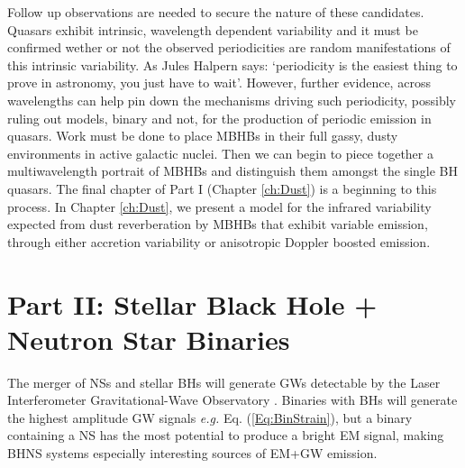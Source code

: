 Follow up observations are needed to secure the nature of these candidates.
Quasars exhibit intrinsic, wavelength dependent variability
\cite{Kelly:2009:DRW,Kozlowski+2010} and it must be confirmed wether or not
the observed periodicities are random manifestations of this intrinsic
variability. As Jules Halpern says: `periodicity is the easiest thing to prove
in astronomy, you just have to wait'. However, further evidence, across
wavelengths can help pin down the mechanisms driving such periodicity,
possibly ruling out models, binary and not, for the production of periodic
emission in quasars. Work must be done to place MBHBs in their full gassy,
dusty environments in active galactic nuclei. Then we can begin to piece
together a multiwavelength portrait of MBHBs and distinguish them amongst the
single BH quasars. The final chapter of Part I (Chapter \ref{ch:Dust}) is a
beginning to this process. In Chapter \ref{ch:Dust}, we present a model for
the infrared variability expected from dust reverberation by MBHBs that
exhibit variable emission, through either accretion variability or anisotropic
Doppler boosted emission.




































\section{Part II: Stellar Black Hole + Neutron Star Binaries}

The merger of NSs and stellar BHs will generate GWs detectable by the Laser
Interferometer Gravitational-Wave Observatory \citep[LIGO][]{aLIGO:2015}.
Binaries with BHs will generate the highest amplitude GW signals \textit{e.g.}
Eq. (\ref{Eq:BinStrain}), but a binary containing a NS has the most potential to
produce a bright EM signal, making BHNS systems especially interesting sources
of EM+GW emission.


